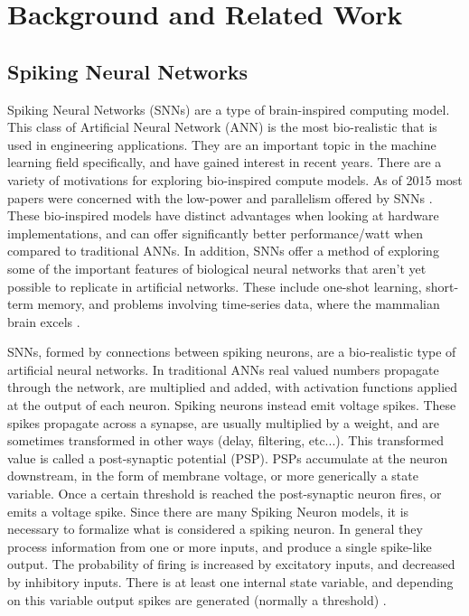 %
%


\chapter{Background and Related Work}\label{chapter:background}
    \section{Spiking Neural Networks}
    Spiking Neural Networks (SNNs) are a type of brain-inspired computing model. This class of
    Artificial Neural Network (ANN) is the most bio-realistic that is used in
    engineering applications. They are an important topic in the machine
    learning field specifically, and have gained interest in recent years. There
    are a variety of motivations for exploring bio-inspired compute models. As
    of 2015 most papers were concerned with the low-power and parallelism
    offered by SNNs \cite{schuman_2017}. These bio-inspired models
    have distinct advantages when looking at hardware implementations, and can
    offer significantly better performance/watt when compared to traditional
    ANNs. In addition, SNNs offer a method of exploring some of the important
    features of biological neural networks that aren't yet possible to replicate
    in artificial networks. These include one-shot learning, short-term memory,
    and problems involving time-series data, where the mammalian brain excels
    \cite{kasabov_2013}.

    
    SNNs, formed by connections between spiking neurons, are a bio-realistic
    type of artificial neural networks. In traditional ANNs real valued numbers
    propagate through the network, are multiplied and added, with activation
    functions applied at the output of each neuron. Spiking neurons instead emit
    voltage spikes. These spikes propagate across a synapse, are usually
    multiplied by a weight, and are sometimes transformed in other ways (delay,
    filtering, etc...). This transformed value is called a post-synaptic
    potential (PSP). PSPs accumulate at the neuron downstream, in the form of
    membrane voltage, or more generically a state variable. Once a certain
    threshold is reached the post-synaptic neuron fires, or emits a voltage
    spike. Since there are many Spiking Neuron models, it is necessary to
    formalize what is considered a spiking neuron. In general they process
    information from one or more inputs, and produce a single spike-like
    output. The probability of firing is increased by excitatory inputs, and
    decreased by inhibitory inputs. There is at least one internal state
    variable, and depending on this variable output spikes are generated
    (normally a threshold) \cite{ponulak_2011}.
    
